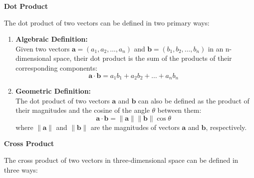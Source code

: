 \documentclass{article}
\begin{document}
\vspace{0.5cm}

\noindent \textbf{Dot Product}

The dot product of two vectors can be defined in two primary ways:

\begin{enumerate}
    \item \textbf{Algebraic Definition:} \\
    Given two vectors \( \bm{a} = (a_1, a_2, \ldots, a_n) \) and \( \bm{b} = (b_1, b_2, \ldots, b_n) \) in an n-dimensional space, their dot product is the sum of the products of their corresponding components:
    \[ \bm{a} \cdot \bm{b} = a_1b_1 + a_2b_2 + \ldots + a_nb_n \]

    \item \textbf{Geometric Definition:} \\
    The dot product of two vectors \( \bm{a} \) and \( \bm{b} \) can also be defined as the product of their magnitudes and the cosine of the angle \( \theta \) between them:
    \[ \bm{a} \cdot \bm{b} = \|\bm{a}\| \|\bm{b}\| \cos \theta \]
    where \( \|\bm{a}\| \) and \( \|\bm{b}\| \) are the magnitudes of vectors \( \bm{a} \) and \( \bm{b} \), respectively.
\end{enumerate}

\vspace{0.5cm}

\noindent \textbf{Cross Product}

The cross product of two vectors in three-dimensional space can be defined in three ways:
\end{document}
